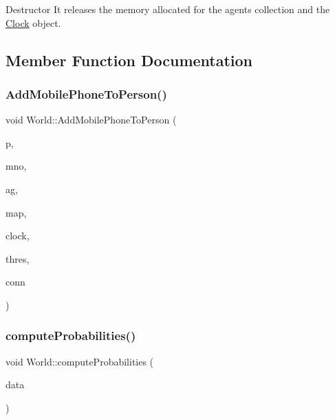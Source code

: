 Destructor It releases the memory allocated for the agents collection and the \hyperlink{class_clock}{Clock} object. 

\subsection{Member Function Documentation}
\mbox{\label{class_world_ac93f975e8fcbe76e92226bd0e9ba2e35}} 
\subsubsection{\texorpdfstring{Add\+Mobile\+Phone\+To\+Person()}{AddMobilePhoneToPerson()}}
{\footnotesize\ttfamily void World\+::\+Add\+Mobile\+Phone\+To\+Person (\begin{DoxyParamCaption}\item[{\hyperlink{class_person}{Person} $\ast$}]{p,  }\item[{\hyperlink{class_mobile_operator}{Mobile\+Operator} $\ast$}]{mno,  }\item[{\hyperlink{class_agents_collection}{Agents\+Collection} $\ast$}]{ag,  }\item[{const \hyperlink{class_map}{Map} $\ast$}]{map,  }\item[{\hyperlink{class_clock}{Clock} $\ast$}]{clock,  }\item[{double}]{thres,  }\item[{\hyperlink{class_holdable_agent_ae2c334b004d7b9c5a999cf2618e4e518}{Holdable\+Agent\+::\+C\+O\+N\+N\+E\+C\+T\+I\+O\+N\+\_\+\+T\+Y\+PE}}]{conn }\end{DoxyParamCaption})\hspace{0.3cm}{\ttfamily [private]}}

\mbox{\label{class_world_ad98b713484ef1c92ded7eec352a496a5}} 
\subsubsection{\texorpdfstring{compute\+Probabilities()}{computeProbabilities()}}
{\footnotesize\ttfamily void World\+::compute\+Probabilities (\begin{DoxyParamCaption}\item[{std\+::map$<$ unsigned long, vector$<$ \hyperlink{class_antenna_info}{Antenna\+Info} $>$$>$}]{data }\end{DoxyParamCaption})}

